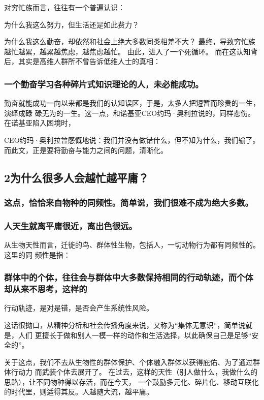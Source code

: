 \documentclass[11pt]{ctexart}
\begin{document}
{{{{对穷忙族而言，往往有一个普遍认识：

为什么我这么努力，但生活还是如此费力？

为什么我这么勤奋，却依然和社会上绝大多数同类相差不大？
最终，导致穷忙族越忙越累，越累越焦虑，越焦虑越忙。
由此，进入了一个死循环。
而在这认知背后，其实是高维人群所不曾告诉低维人士的真相：
\subsubsection{一个勤奋学习各种碎片式知识理论的人，未必能成功。}
\label{sec:org007a4bc}
勤奋就能成功一向以来都是我们的认知误区，于是，太多人把短暂而珍贵的一生，演绎成碌
碌无为的一生。这一点，和诺基亚CEO约玛·奥利拉说的，同样悲伤。在诺基亚陷入困境时，

CEO约玛·奥利拉曾感慨地说：我们并没有做错什么，但不知为什么，我们输了。
而此文，正是要将勤奋与能力之间的问题，清晰化。

\subsection{2为什么很多人会越忙越平庸？}
\label{sec:orge50aab2}

\subsubsection{这点，恰恰来自物种的同频性。简单说，我们很难不成为绝大多数。}
\label{sec:org0506178}

\subsubsection{人天生就离平庸很近，离出色很远。}
\label{sec:orgc5b6006}

从生物天性而言，迁徙的鸟、群体性生物，包括人，一切动物行为都有同频性的。这里的同
频性是指：

\subsubsection{群体中的个体，往往会与群体中大多数保持相同的行动轨迹，而个体却从来不思考，这样的}
\label{sec:orgab145d0}
行动轨迹，是对是错，是否会产生系统性风险。

这话很拗口，从精神分析和社会传播角度来说，又称为“集体无意识”，简单说就是，人们
更擅长于做和别人一模一样的动作和生活选择，以此确保自己是足够“安全的”。

关于这点，我们不去从生物性的群体保护、个体融入群体以获得庇佑、为了通过群体行动力
而武装个体去展开了。
在过去，这样的天性（别人做什么，我做什么的思路），让不同物种得以存活，而在今天，
一个鼓励多元化、碎片化、移动互联化的时代里，则适得其反。人越随大流，越平庸。

}}}}
\end{document}
